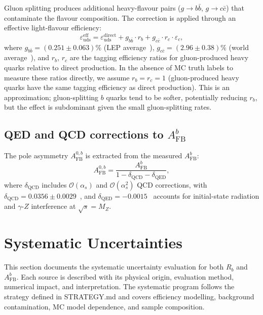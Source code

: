 \documentclass[11pt,a4paper]{article}
\begin{document}
Gluon splitting produces additional heavy-flavour pairs ($g \to b\bar{b}$,
$g \to c\bar{c}$) that contaminate the flavour composition. The correction is
applied through an effective light-flavour efficiency:
\begin{equation}
\varepsilon_\mathrm{uds}^\mathrm{eff} = \varepsilon_\mathrm{uds}^\mathrm{direct}
+ g_{b\bar{b}} \cdot r_b + g_{c\bar{c}} \cdot r_c \cdot \varepsilon_c,
\label{eq:gluon_correction}
\end{equation}
where $g_{b\bar{b}} = (0.251 \pm 0.063)\%$ (LEP average~\cite{LEP:HF:2001}),
$g_{c\bar{c}} = (2.96 \pm 0.38)\%$ (world average~\cite{LEP:gcc}), and $r_b$, $r_c$
are the tagging efficiency ratios for gluon-produced heavy quarks relative to direct
production. In the absence of MC truth labels to measure these ratios directly,
we assume $r_b = r_c = 1$ (gluon-produced heavy quarks have the same tagging
efficiency as direct production). This is an approximation; gluon-splitting
$b$ quarks tend to be softer, potentially reducing $r_b$, but the effect
is subdominant given the small gluon-splitting rates.

\subsection{QED and QCD corrections to $A_\mathrm{FB}^b$}
\label{sec:qcd_corrections}

The pole asymmetry $A_\mathrm{FB}^{0,b}$ is extracted from the measured $A_\mathrm{FB}^b$:
\begin{equation}
A_\mathrm{FB}^{0,b} = \frac{A_\mathrm{FB}^b}{1 - \delta_\mathrm{QCD} - \delta_\mathrm{QED}},
\label{eq:pole_correction}
\end{equation}
where $\delta_\mathrm{QCD}$ includes $\mathcal{O}(\alpha_s)$ and $\mathcal{O}(\alpha_s^2)$
QCD corrections, with $\delta_\mathrm{QCD} = 0.0356 \pm 0.0029$~\cite{LEP:EWWG:2005},
and $\delta_\mathrm{QED} = -0.0015$~\cite{LEP:EWWG:2005} accounts for initial-state
radiation and $\gamma$-$Z$ interference at $\sqrt{s} = M_Z$.

\FloatBarrier
{}
\section{Systematic Uncertainties}
\label{sec:systematics}

This section documents the systematic uncertainty evaluation for both $R_b$ and
$A_\mathrm{FB}^b$. Each source is described with its physical origin, evaluation
method, numerical impact, and interpretation. The systematic program follows the
strategy defined in STRATEGY.md and covers efficiency modelling, background
contamination, MC model dependence, and sample composition.
\end{document}
